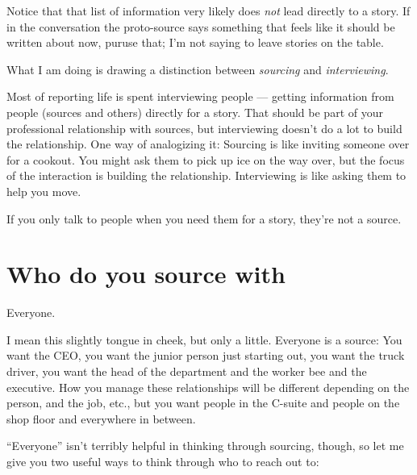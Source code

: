 \documentclass[
  11pt,
  american,
  letterpaperpaper,
  extrafontsizes,onecolumn,openright
  ]{memoir}
\begin{document}
Notice that that list of information very likely does \emph{not} lead directly to a story. If in the conversation the proto-source says something that feels like it should be written about now, puruse that; I'm not saying to leave stories on the table.

What I am doing is drawing a distinction between \emph{sourcing} and \emph{interviewing}.

Most of reporting life is spent interviewing people --- getting information from people (sources and others) directly for a story. That should be part of your professional relationship with sources, but interviewing doesn't do a lot to build the relationship. One way of analogizing it: Sourcing is like inviting someone over for a cookout. You might ask them to pick up ice on the way over, but the focus of the interaction is building the relationship. Interviewing is like asking them to help you move.

If you only talk to people when you need them for a story, they're not a source.

\hypertarget{who-do-you-source-with}{%
\section*{Who do you source with}\label{who-do-you-source-with}}

Everyone.

I mean this slightly tongue in cheek, but only a little. Everyone is a source: You want the CEO, you want the junior person just starting out, you want the truck driver, you want the head of the department and the worker bee and the executive. How you manage these relationships will be different depending on the person, and the job, etc., but you want people in the C-suite and people on the shop floor and everywhere in between.

\enquote{Everyone} isn't terribly helpful in thinking through sourcing, though, so let me give you two useful ways to think through who to reach out to:
\end{document}
